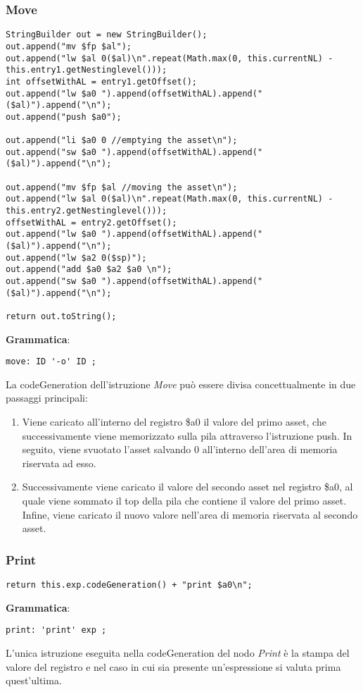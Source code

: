 \documentclass[12pt,twoside,openright,a4paper]{report}
\begin{document}
\subsubsection{Move}
\begin{lstlisting}
StringBuilder out = new StringBuilder();
out.append("mv $fp $al");
out.append("lw $al 0($al)\n".repeat(Math.max(0, this.currentNL) - this.entry1.getNestinglevel()));
int offsetWithAL = entry1.getOffset();
out.append("lw $a0 ").append(offsetWithAL).append("($al)").append("\n");
out.append("push $a0");

out.append("li $a0 0 //emptying the asset\n");
out.append("sw $a0 ").append(offsetWithAL).append("($al)").append("\n");

out.append("mv $fp $al //moving the asset\n");
out.append("lw $al 0($al)\n".repeat(Math.max(0, this.currentNL) - this.entry2.getNestinglevel()));
offsetWithAL = entry2.getOffset();
out.append("lw $a0 ").append(offsetWithAL).append("($al)").append("\n");
out.append("lw $a2 0($sp)");
out.append("add $a0 $a2 $a0 \n");
out.append("sw $a0 ").append(offsetWithAL).append("($al)").append("\n");

return out.toString();
\end{lstlisting}
\textbf{Grammatica}:
\begin{lstlisting}
move: ID '-o' ID ;
\end{lstlisting}
La codeGeneration dell'istruzione \textit{Move} può essere divisa concettualmente in due passaggi principali:
\begin{enumerate}
    \item Viene caricato all'interno del registro \$a0 il valore del primo asset, che successivamente viene memorizzato sulla pila attraverso l'istruzione push. In seguito, viene svuotato l'asset salvando 0 all'interno dell'area di memoria riservata ad esso.
    \item Successivamente viene caricato il valore del secondo asset nel registro \$a0, al quale viene sommato il top della pila che contiene il valore del primo asset. Infine, viene caricato il nuovo valore nell'area di memoria riservata al secondo asset.
\end{enumerate}
\newpage
\subsubsection{Print}
\begin{lstlisting}
return this.exp.codeGeneration() + "print $a0\n";
\end{lstlisting}
\textbf{Grammatica}:
\begin{lstlisting}
print: 'print' exp ;
\end{lstlisting}
L'unica istruzione eseguita nella codeGeneration del nodo \textit{Print} è la stampa del valore del registro e nel caso in cui sia presente un'espressione si valuta prima quest'ultima.
\end{document}
